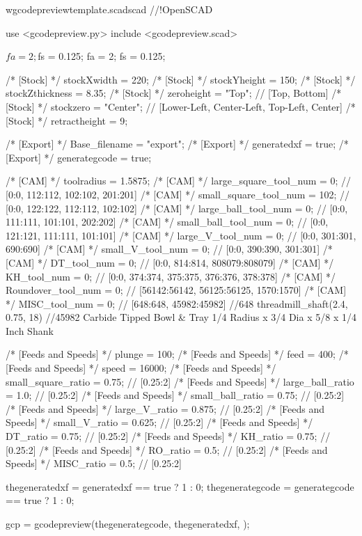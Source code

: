 \documentclass{ltxdoc}
\begin{document}
\lstset{firstnumber=1}%
\begin{writecode}{w}{gcodepreviewtemplate.scad}{scad}
//!OpenSCAD

use <gcodepreview.py>
include <gcodepreview.scad>

$fa = 2;
$fs = 0.125;
fa = 2;
fs = 0.125;

/* [Stock] */
stockXwidth = 220;
/* [Stock] */
stockYheight = 150;
/* [Stock] */
stockZthickness = 8.35;
/* [Stock] */
zeroheight = "Top"; // [Top, Bottom]
/* [Stock] */
stockzero = "Center"; // [Lower-Left, Center-Left, Top-Left, Center]
/* [Stock] */
retractheight = 9;

/* [Export] */
Base_filename = "export";
/* [Export] */
generatedxf = true;
/* [Export] */
generategcode = true;

/* [CAM] */
toolradius = 1.5875;
/* [CAM] */
large_square_tool_num = 0; // [0:0, 112:112, 102:102, 201:201]
/* [CAM] */
small_square_tool_num = 102; // [0:0, 122:122, 112:112, 102:102]
/* [CAM] */
large_ball_tool_num = 0; // [0:0, 111:111, 101:101, 202:202]
/* [CAM] */
small_ball_tool_num = 0; // [0:0, 121:121, 111:111, 101:101]
/* [CAM] */
large_V_tool_num = 0; // [0:0, 301:301, 690:690]
/* [CAM] */
small_V_tool_num = 0; // [0:0, 390:390, 301:301]
/* [CAM] */
DT_tool_num = 0; // [0:0, 814:814, 808079:808079]
/* [CAM] */
KH_tool_num = 0; // [0:0, 374:374, 375:375, 376:376, 378:378]
/* [CAM] */
Roundover_tool_num = 0; // [56142:56142, 56125:56125, 1570:1570]
/* [CAM] */
MISC_tool_num = 0; // [648:648, 45982:45982]
//648 threadmill_shaft(2.4, 0.75, 18)
//45982 Carbide Tipped Bowl & Tray 1/4 Radius x 3/4 Dia x 5/8 x 1/4 Inch Shank

/* [Feeds and Speeds] */
plunge = 100;
/* [Feeds and Speeds] */
feed = 400;
/* [Feeds and Speeds] */
speed = 16000;
/* [Feeds and Speeds] */
small_square_ratio = 0.75; // [0.25:2]
/* [Feeds and Speeds] */
large_ball_ratio = 1.0; // [0.25:2]
/* [Feeds and Speeds] */
small_ball_ratio = 0.75; // [0.25:2]
/* [Feeds and Speeds] */
large_V_ratio = 0.875; // [0.25:2]
/* [Feeds and Speeds] */
small_V_ratio = 0.625; // [0.25:2]
/* [Feeds and Speeds] */
DT_ratio = 0.75; // [0.25:2]
/* [Feeds and Speeds] */
KH_ratio = 0.75; // [0.25:2]
/* [Feeds and Speeds] */
RO_ratio = 0.5; // [0.25:2]
/* [Feeds and Speeds] */
MISC_ratio = 0.5; // [0.25:2]

thegeneratedxf = generatedxf == true ? 1 : 0;
thegenerategcode = generategcode == true ? 1 : 0;

gcp = gcodepreview(thegenerategcode,
                   thegeneratedxf,
                   );


\end{writecode}
\end{document}
